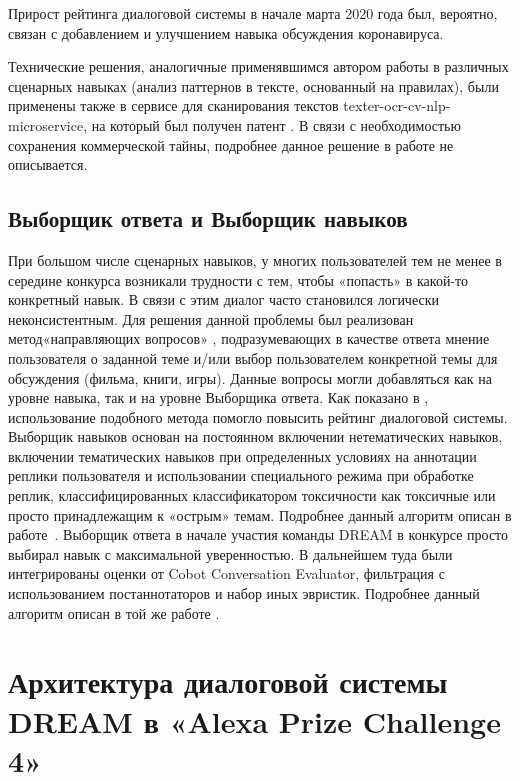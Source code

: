  Прирост рейтинга диалоговой системы в начале марта 2020 года был, вероятно, связан с добавлением и улучшением навыка обсуждения коронавируса.

Технические решения, аналогичные применявшимся автором работы в различных сценарных навыках (анализ паттернов в тексте, основанный на правилах), были применены также в сервисе для сканирования текстов texter-ocr-cv-nlp-microservice, на который был получен патент \cite{Дуплякин_Дмитрий_Ондар_Ушаков_2021}. В связи с необходимостью сохранения коммерческой тайны, подробнее данное решение в работе не описывается.

\subsection{Выборщик ответа и Выборщик навыков}

При большом числе сценарных навыков, у многих пользователей тем не менее в середине конкурса возникали трудности с тем, чтобы «попасть» в какой-то конкретный навык. В связи с этим диалог часто становился логически неконсистентным. Для решения данной проблемы был реализован метод«направляющих вопросов» , подразумевающих в качестве ответа мнение пользователя о заданной теме и/или выбор пользователем конкретной темы для обсуждения (фильма, книги, игры). Данные вопросы могли добавляться как на уровне навыка, так и на уровне Выборщика ответа. Как показано в \cite{dream1}, использование подобного метода помогло повысить рейтинг диалоговой системы.
Выборщик навыков основан на постоянном включении нетематических навыков, включении тематических навыков при определенных условиях на аннотации реплики пользователя и использовании специального режима при обработке реплик, классифицированных классификатором токсичности как токсичные или просто принадлежащим к «острым» темам. Подробнее данный алгоритм описан в работе~\cite{dilya_thesis}.
Выборщик ответа в начале участия команды {DREAM} в конкурсе просто выбирал навык с максимальной уверенностью. В дальнейшем туда были интегрированы оценки от Cobot Conversation Evaluator, фильтрация с использованием постаннотаторов и набор иных эвристик. Подробнее данный алгоритм описан в той же работе \cite{dilya_thesis}.

\section{Архитектура диалоговой системы {DREAM} в  «Alexa Prize Challenge 4»}


